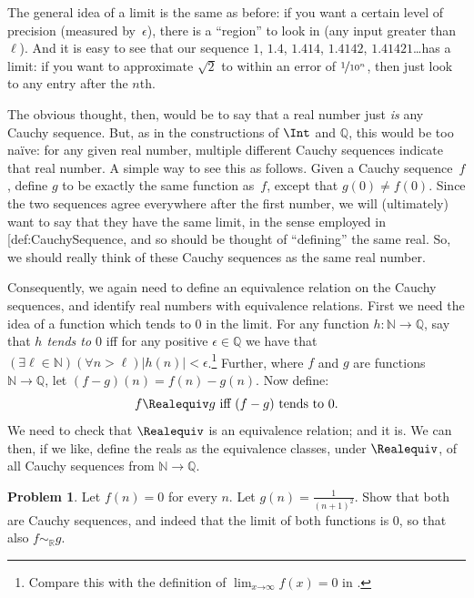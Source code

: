 \documentclass[10pt,a4paper]{article}
\makeatletter
\theoremstyle{plain}
\theoremstyle{definition}
\newtheorem{prob}{Problem}[section]
\theoremstyle{remark}
\newcommand{\olref}{\@ifnextchar[{\olref@i}{\olref@final}}
\def\olref@i[#1]{\@ifnextchar[{\olref@ii}{\olref@final}}
\def\olref@ii[#1]{\@ifnextchar[{\olref@iii}{\olref@final}}
\def\olref@iii[#1]{\olref@final}
\def\olref@final#1{\ref{#1}}
\providecommand{\Nat}{\ensuremath{\mathbb{N}}}
\providecommand{\Rat}{\mathbb{Q}}
\providecommand{\Real}{\mathbb{R}}
\makeatother
\begin{document}
The general idea of a limit is the same as before: if you want a
certain level of precision (measured by~$\epsilon$), there is a
``region'' to look in (any input greater than~$\ell$). And it is easy
to see that our sequence $1$, $1.4$, $1.414$, $1.4142$,
$1.41421$\ldots has a limit: if you want to approximate $\sqrt{2}$ to
within an error of $\nicefrac{1}{10^{n}}$, then just look to any entry
after the $n$th.

The obvious thought, then, would be to say that a real number just
\emph{is} any Cauchy sequence. But, as in the constructions of $\Int$
and $\Rat$, this would be too na\"{i}ve: for any given real number,
multiple different Cauchy sequences indicate that real number. A
simple way to see this as follows. Given a Cauchy sequence~$f$, define
$g$ to be exactly the same function as~$f$, except that $g(0)\neq
f(0)$. Since the two sequences agree everywhere after the first
number, we will (ultimately) want to say that they have the same
limit, in the sense employed in \olref{def:CauchySequence},
and so should be thought of ``defining'' the same real. So, we should
really think of these Cauchy sequences as the same real number.

Consequently, we again need to define an equivalence relation on the
Cauchy sequences, and identify real numbers with equivalence
relations. First we need the idea of a function which tends to $0$ in
the limit. For any function $h : \Nat \to \Rat$, say that \emph{$h$
tends to $0$} iff for any positive $\epsilon \in \Rat$ we have that
$(\exists \ell \in \Nat)(\forall n > \ell)|h(n)| <
\epsilon$.\footnote{Compare this with the definition of $\lim_{x
\mathord{\rightarrow}\infty}f(x) = 0$ in
\olref[his][set][limits]{sec}.} Further, where $f$ and $g$ are
functions $\Nat \to \Rat$, let $(f-g)(n) = f(n) - g(n)$. Now define:
\[
	f \Realequiv g \text{ iff $(f-g)$ tends to $0$}.
\]
We need to check that $\Realequiv$ is an equivalence relation; and it
is. We can then, if we like, define the reals as the equivalence
classes, under $\Realequiv$, of all Cauchy sequences from $\Nat \to
\Rat$.

\begin{prob}
Let $f(n) = 0$ for every $n$. Let $g(n) = \frac{1}{(n+1)^2}$. Show
that both are Cauchy sequences, and indeed that the limit of both
functions is $0$, so that also $f \sim_\Real g$. 
\end{prob}
\end{document}
